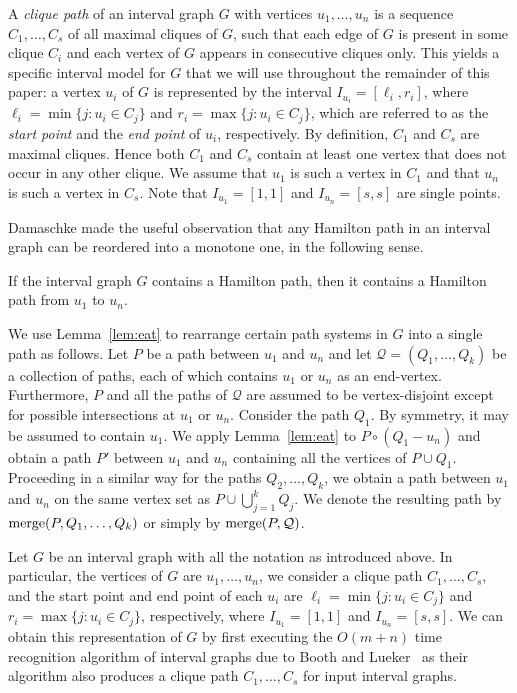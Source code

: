 \documentclass{llncs}
\DeclareMathOperator{\merg}{{\rm merge}}
\newcommand{\cQ}{{\mathcal Q}}
\begin{document}
A {\it clique path} of an interval graph $G$ with vertices $u_1,\ldots,u_n$ is a sequence $C_1,\ldots,C_s$ of all maximal cliques of $G$, such that each edge of $G$ is present in some clique $C_i$ and
each vertex of $G$ appears in consecutive cliques only. This yields a specific interval model for $G$ that we will use throughout the remainder of this paper: a vertex $u_i$ of $G$ is represented by the interval 
$I_{u_i}=[\ell_i,r_i]$, where $\ell_i=\min \{j : u_i\in C_j\}$ and $r_i=\max \{j : u_i\in C_j\}$, which are referred to as the {\it start point} and the {\it end point} of $u_i$, respectively.
By definition, $C_1$ and $C_s$ are maximal cliques. Hence both $C_1$ and $C_s$ contain at least one vertex that does not occur in any other clique.
We assume that $u_1$ is such a vertex in $C_1$ and that $u_n$ is such a vertex in $C_s$. Note that $I_{u_1}=[1,1]$ and $I_{u_n}=[s,s]$ are single points. 

Damaschke made the useful observation that any Hamilton path in an interval graph can be reordered into a monotone one, in the following sense.

\begin{lemma}[\cite{Da93}]\label{lem:eat}
If the interval graph $G$ contains a Hamilton path, then it contains a Hamilton
path from $u_1$ to $u_n$. 
\end{lemma}

We use Lemma~\ref{lem:eat} to rearrange certain path systems in $G$ into a single path as follows. Let $P$ be a path between $u_1$ and $u_n$ and let $\cQ=(Q_1,\dots,Q_k)$ be a collection of paths, each of which contains $u_1$ or $u_n$ as an end-vertex. Furthermore, $P$ and all the paths of $\cQ$ are assumed to be vertex-disjoint except for possible intersections at $u_1$ or $u_n$. Consider the path $Q_1$. By symmetry, it may be assumed to contain $u_1$. We
apply Lemma~\ref{lem:eat} to $P\circ (Q_1-u_n)$ and obtain a path $P'$ between $u_1$ and $u_n$
containing all the vertices of $P\cup Q_1$. Proceeding in a similar way for the paths $Q_2,\dots,Q_k$, we obtain a path between $u_1$ and $u_n$
on the same vertex set as $P\cup\bigcup_{j=1}^k Q_j$. We denote the resulting path by
$\merg(P,Q_1,\dots,Q_k)$ or simply by $\merg(P,\cQ)$.

Let $G$ be an interval graph with all the notation as introduced above. In particular, the vertices of $G$ are $u_1,\ldots, u_n$, we consider a clique path $C_1,\dots,C_s$, and the start point and end point of each $u_i$ are $\ell_i=\min \{j : u_i\in C_j\}$
and $r_i=\max \{j : u_i\in C_j\}$, respectively, 
where $I_{u_1}=[1,1]$ and $I_{u_n}=[s,s]$.
We can obtain this representation of $G$ by first executing the $O(m+n)$ time recognition algorithm of interval graphs due to Booth and Lueker~\cite{BL76} as their algorithm also produces a clique path $C_1,\dots,C_s$ for input interval graphs.
\end{document}
